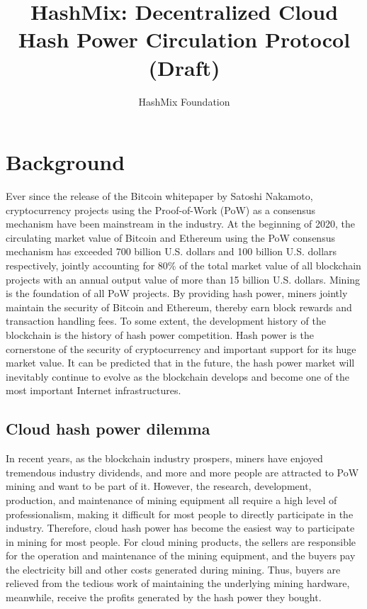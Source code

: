 \documentclass[]{template/llncs}
\begin{document}

\pagestyle{plain}

%
\title{HashMix: Decentralized Cloud Hash Power Circulation Protocol (Draft)}

\author{HashMix Foundation}


\maketitle


\section{Background}

Ever since the release of the Bitcoin whitepaper by Satoshi Nakamoto, cryptocurrency projects using the Proof-of-Work (PoW) as a consensus mechanism have been mainstream in the industry. At the beginning of 2020, the circulating market value of Bitcoin and Ethereum using the PoW consensus mechanism has exceeded 700 billion U.S. dollars and 100 billion U.S. dollars respectively, jointly accounting for 80\% of the total market value of all blockchain projects with an annual output value of more than 15 billion U.S. dollars. Mining is the foundation of all PoW projects. By providing hash power, miners jointly maintain the security of Bitcoin and Ethereum, thereby earn block rewards and transaction handling fees. To some extent, the development history of the blockchain is the history of hash power competition. Hash power is the cornerstone of the security of cryptocurrency and important support for its huge market value. It can be predicted that in the future, the hash power market will inevitably continue to evolve as the blockchain develops and become one of the most important Internet infrastructures.

\subsection{Cloud hash power dilemma}

In recent years, as the blockchain industry prospers, miners have enjoyed tremendous industry dividends, and more and more people are attracted to PoW mining and want to be part of it. However, the research, development, production, and maintenance of mining equipment all require a high level of professionalism, making it difficult for most people to directly participate in the industry. Therefore, cloud hash power has become the easiest way to participate in mining for most people. For cloud mining products, the sellers are responsible for the operation and maintenance of the mining equipment, and the buyers pay the electricity bill and other costs generated during mining. Thus, buyers are relieved from the tedious work of maintaining the underlying mining hardware, meanwhile, receive the profits generated by the hash power they bought.
\end{document}
